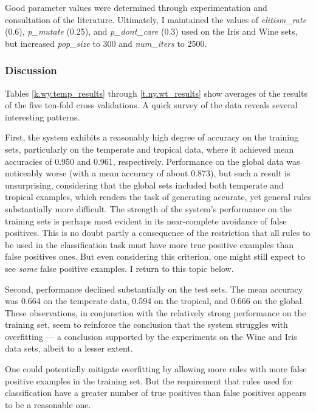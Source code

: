 \documentclass[11pt]{article}
\begin{document}
Good parameter values were determined through experimentation and consultation of the literature. Ultimately, I maintained the values of \textit{elitism\_rate} (0.6), \textit{p\_mutate} (0.25), and \textit{p\_dont\_care} (0.3) used on the Iris and Wine sets, but increased \textit{pop\_size} to 300 and \textit{num\_iters} to 2500.

\subsubsection{Discussion}

Tables \ref{k.wy.temp_results} through \ref{t.ny.wt_results} show averages of the results of the five ten-fold cross validations. A quick survey of the data reveals several interesting patterns.

First, the system exhibits a reasonably high degree of accuracy on the training sets, particularly on the temperate and tropical data, where it achieved mean accuracies of 0.950 and 0.961, respectively. Performance on the global data was noticeably worse (with a mean accuracy of about 0.873), but such a result is unsurprising, considering that the global sets included both temperate and tropical examples, which renders the task of generating accurate, yet general rules substantially more difficult. The strength of the system's performance on the training sets is perhaps most evident in its near-complete avoidance of false positives. This is no doubt partly a consequence of the restriction that all rules to be used in the classification task must have more true positive examples than false positives ones. But even considering this criterion, one might still expect to see \emph{some} false positive examples. I return to this topic below.

Second, performance declined substantially on the test sets. The mean accuracy was 0.664 on the temperate data, 0.594 on the tropical, and 0.666 on the global. These observations, in conjunction with the relatively strong performance on the training set, seem to reinforce the conclusion that the system struggles with overfitting --- a conclusion supported by the experiments on the Wine and Iris data sets, albeit to a lesser extent.

One could potentially mitigate overfitting by allowing more rules with more false positive examples in the training set. But the requirement that rules used for classification have a greater number of true positives than false positives appears to be a reasonable one. 
\end{document}
